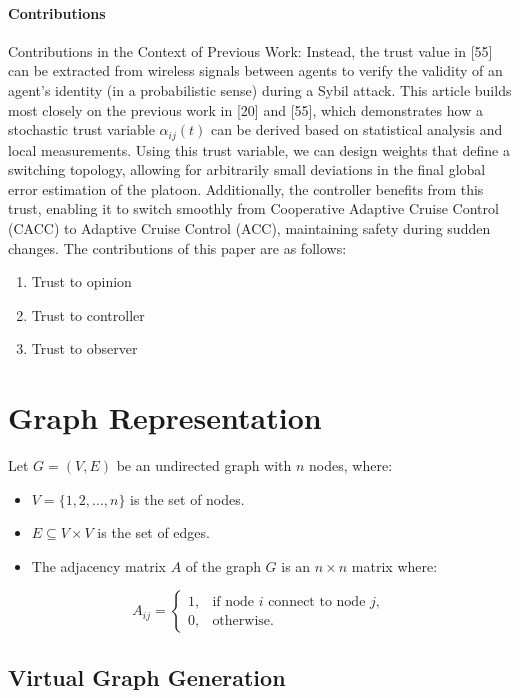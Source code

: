 \documentclass[letterpaper, 10pt, conference]{ieeeconf}  %
\begin{document}
\paragraph{Contributions}
Contributions in the Context of Previous Work: Instead, the trust value in [55] can be extracted from wireless signals between agents to verify the validity of an agent's identity (in a probabilistic sense) during a Sybil attack. This article builds most closely on the previous work in [20] and [55], which demonstrates how a stochastic trust variable $\alpha_{ij}(t)$ can be derived based on statistical analysis and local measurements. Using this trust variable, we can design weights that define a switching topology, allowing for arbitrarily small deviations in the final global error estimation of the platoon. Additionally, the controller benefits from this trust, enabling it to switch smoothly from Cooperative Adaptive Cruise Control (CACC) to Adaptive Cruise Control (ACC), maintaining safety during sudden changes.
The contributions of this paper are as follows:
\begin{enumerate}
\item Trust to opinion
\item Trust to controller
\item Trust to observer

\end{enumerate}


\section{Graph Representation}
Let $G = (V, E)$ be an undirected graph with $n$ nodes, where:
\begin{itemize}
    \item $V = \{1, 2, \dots, n\}$ is the set of nodes.
    \item $E \subseteq V \times V$ is the set of edges.
    \item The adjacency matrix $A$ of the graph $G$ is an $n \times n$ matrix where:
\end{itemize}
\begin{equation}
        A_{ij} = \begin{cases}
            1, & \text{if node } i \text{ connect} \text{ to node } j , \\
            0, & \text{otherwise}.
        \end{cases}
    \end{equation}
\subsection{\color{red}Virtual Graph Generation}
\end{document}
